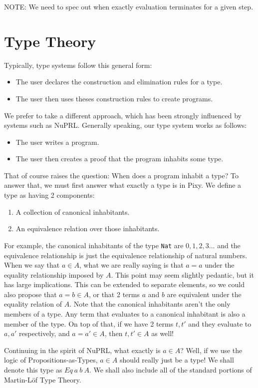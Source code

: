 \documentclass{article}
\begin{document}
{\color{red} NOTE:} We need to spec out when exactly evaluation terminates for a given step.

\section{Type Theory}
Typically, type systems follow this general form:
\begin{itemize}
    \item The user declares the construction and elimination rules for a type.
    \item The user then uses theses construction rules to create programs.
\end{itemize}
We prefer to take a different approach, which has been strongly influenced 
by systems such as NuPRL. Generally speaking, our type system works as follows:
\begin{itemize}
    \item The user writes a program.
    \item The user then creates a proof that the program inhabits some type.
\end{itemize}

That of course raises the question: When does a program inhabit a type? To answer that, we must first answer what exactly a type is in Pixy. We define a type as having 2 components:
\begin{enumerate}
    \item A collection of canonical inhabitants.
    \item An equivalence relation over those inhabitants.
\end{enumerate}

For example, the canonical inhabitants of the type \lstinline{Nat} are $0,1,2,3...$ and the equivalence relationship is just the equivalence relationship of natural numbers. When we say that $a \in A$, what we are really saying is that $a = a$ under the equality relationship imposed by $A$. This point may seem slightly pedantic, but it has large implications. This can be extended to separate elements, so we could also propose that $a = b \in A$, or that 2 terms $a$ and $b$ are equivalent under the equality relation of $A$. Note that the canonical inhabitants aren't the only members of a type. Any term that evaluates to a canonical inhabitant is also a member of the type. On top of that, if we have 2 terms $t, t'$ and they evaluate to $a, a'$ respectively, and $a = a' \in A$, then $t, t' \in A$ as well!

Continuing in the spirit of NuPRL, what exactly is $a \in A$? Well, if we use the logic of Propositions-as-Types, $a \in A$ should really just be a type! We shall denote this type as $Eq\ a\ b\ A$. We shall also include all of the standard portions of Martin-Löf Type Theory.
\end{document}
